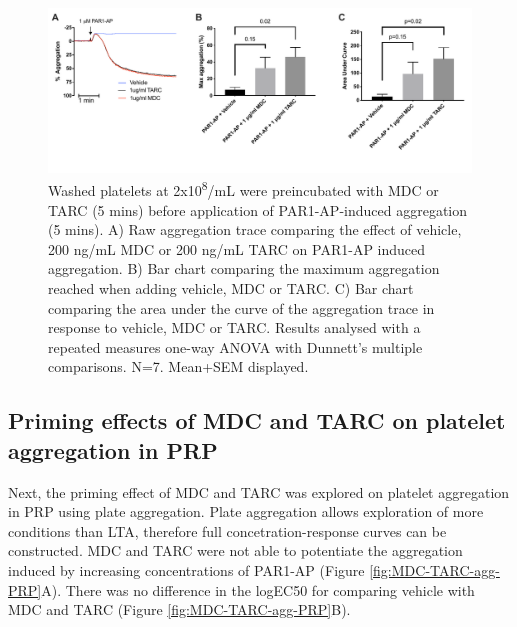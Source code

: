 \documentclass[11pt,twoside]{bristolthesis}
\begin{document}
\begin{figure}
\includegraphics[width=0.8\linewidth]{figure/Chemokines/Layouts/MDC_TARC_aggregation_PAR1} \caption[The priming effect of the chemokines MDC and TARC on PAR1-AP induced platelet aggregation in washed platelets]{Washed platelets at 2x10\textsuperscript{8}/mL were preincubated with MDC or TARC (5 mins) before application of PAR1-AP-induced aggregation (5 mins). A) Raw aggregation trace comparing the effect of vehicle, 200 ng/mL MDC or 200 ng/mL TARC on PAR1-AP induced aggregation. B) Bar chart comparing the maximum aggregation reached when adding vehicle, MDC or TARC. C) Bar chart comparing the area under the curve of the aggregation trace in response to vehicle, MDC or TARC. Results analysed with a repeated measures one-way ANOVA with Dunnett's multiple comparisons. N=7. Mean+SEM displayed.}\label{fig:MDC-TARC-agg}
\end{figure}
\hypertarget{priming-effects-of-mdc-and-tarc-on-platelet-aggregation-in-prp}{%
\subsection{Priming effects of MDC and TARC on platelet aggregation in PRP}\label{priming-effects-of-mdc-and-tarc-on-platelet-aggregation-in-prp}}

Next, the priming effect of MDC and TARC was explored on platelet aggregation in PRP using plate aggregation. Plate aggregation allows exploration of more conditions than LTA, therefore full concetration-response curves can be constructed. MDC and TARC were not able to potentiate the aggregation induced by increasing concentrations of PAR1-AP (Figure \ref{fig:MDC-TARC-agg-PRP}A). There was no difference in the logEC50 for comparing vehicle with MDC and TARC (Figure \ref{fig:MDC-TARC-agg-PRP}B).
\end{document}
